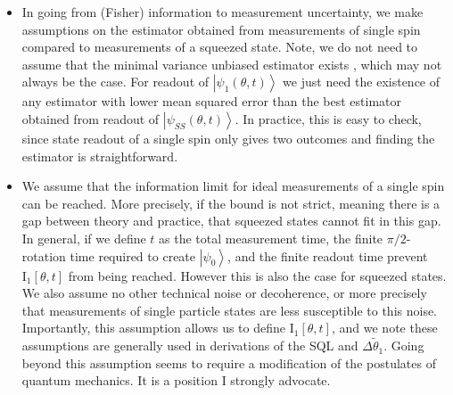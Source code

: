 \documentclass[reqno]{amsart}
\def\est#1{\tilde{#1}}
\newcommand{\ket}[1]{\left| #1 \right>}
\def\funcwrt#1#2#3{\mathrm{#1}_{\mathrm{#3}}\left[#2\right]}
\begin{document}
\begin{itemize}
\item In going from (Fisher) information to measurement uncertainty, we make assumptions on the estimator obtained from measurements of single spin compared to measurements of a squeezed state. Note, we do not need to assume that the minimal variance unbiased estimator exists \cite{Kay1993}, which may not always be the case. For readout of $\ket{\psi_1(\theta,t)}$ we just need the existence of any estimator with lower mean squared error than the best estimator obtained from readout of $\ket{\psi_{SS}(\theta,t)}$. In practice, this is easy to check, since state readout of a single spin only gives two outcomes and finding the estimator is straightforward.
\item We assume that the information limit for ideal measurements of a single spin can be reached. More precisely, if the bound is not strict, meaning there is a gap between theory and practice, that squeezed states cannot fit in this gap. In general, if we define $t$ as the total measurement time, the finite $\pi/2$-rotation time required to create $\ket{\psi_0}$, and the finite readout time prevent $\funcwrt{I}{\theta,t}{1}$ from being reached. However this is also the case for squeezed states. We also assume no other technical noise or decoherence, or more precisely that measurements of single particle states are less susceptible to this noise. Importantly, this assumption allows us to define $\funcwrt{I}{\theta,t}{1}$, and we note these assumptions are generally used in derivations of the SQL and $\Delta \est{\theta}_1$. Going beyond this assumption seems to require a modification of the postulates of quantum mechanics. It is a position I strongly advocate.
\\
\end{itemize}
\end{document}
